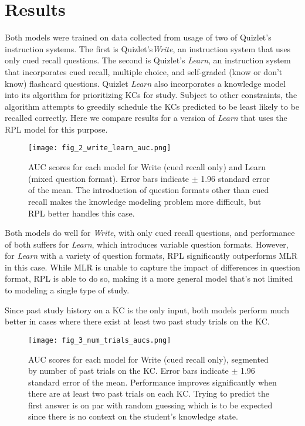 \documentclass[a4paper,12pt]{article}
\begin{document}
\section{Results}
Both models were trained on data collected from usage of two of Quizlet's instruction systems. The first is Quizlet's\textit{Write}, an instruction system that uses only cued recall questions. The second is Quizlet's \textit{Learn}, an instruction system that incorporates cued recall, multiple choice, and self-graded (know or don't know) flashcard questions. Quizlet \textit{Learn} also incorporates a knowledge model into its algorithm for prioritizing KCs for study. Subject to other constraints, the algorithm attempts to greedily schedule the KCs predicted to be least likely to be recalled correctly. Here we compare results for a version of \textit{Learn} that uses the RPL model for this purpose.

\begin{figure}[H]
\centering
\texttt{[image: fig\_2\_write\_learn\_auc.png]}
\caption{AUC scores for each model for Write (cued recall only) and Learn (mixed question format). Error bars indicate $\pm$ 1.96 standard error of the mean. The introduction of question formats other than cued recall makes the knowledge modeling problem more difficult, but RPL better handles this case.}
\end{figure}
	
Both models do well for \textit{Write}, with only cued recall questions, and performance of both suffers for \textit{Learn}, which introduces variable question formats. However, for \textit{Learn} with a variety of question formats, RPL significantly outperforms MLR in this case. While MLR is unable to capture the impact of differences in question format, RPL is able to do so, making it a more general model that's not limited to modeling a single type of study.

Since past study history on a KC is the only input, both models perform much better in cases where there exist at least two past study trials on the KC.

\begin{figure}[H]
\centering
\texttt{[image: fig\_3\_num\_trials\_aucs.png]}
\caption{AUC scores for each model for Write (cued recall only), segmented by number of past trials on the KC. Error bars indicate $\pm$ 1.96 standard error of the mean. Performance improves significantly when there are at least two past trials on each KC. Trying to predict the first answer is on par with random guessing which is to be expected since there is no context on the student's knowledge state.}
\end{figure}
\end{document}
